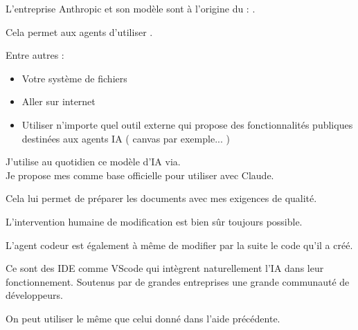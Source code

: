 \begin{Aide}

    \begin{MultiColonnes}{5}
        \tcbitem[raster multicolumn=2] L'entreprise Anthropic et son modèle  sont à l'origine du  : .
        
        Cela permet aux agents d'utiliser . 
    
        \tcbitem[raster multicolumn=3] Entre autres : 
    \begin{itemize}[label=$\bullet$]
        \item Votre système de fichiers
        \item Aller sur internet
        \item Utiliser n'importe quel outil externe qui propose des fonctionnalités publiques destinées aux agents IA ( canvas par exemple... )
    \end{itemize}
    \end{MultiColonnes}
    

    \begin{MultiColonnes}{5}
        \tcbitem[raster multicolumn=3] J'utilise au quotidien ce modèle d'IA via. \\
    
    Je propose mes  comme base officielle pour utiliser  avec Claude.

    Cela lui permet de préparer les documents avec mes exigences de qualité.
    \tcbitem[raster multicolumn=2,colframe=\itemBaseColor,title=Prompts de bfcours, boxrule=0.4pt,fonttitle=\bfseries,halign=left] 
    \end{MultiColonnes}
    L'intervention humaine de modification est bien sûr toujours possible. 
    
    L'agent codeur est également à même de modifier par la suite le code qu'il a créé.
\end{Aide}

\begin{Aide}
    Ce sont des IDE comme VScode qui intègrent naturellement l'IA dans leur fonctionnement. Soutenus par de grandes entreprises une grande communauté de développeurs.

    On peut utiliser le même  que celui donné dans l'aide précédente. 
\end{Aide}

